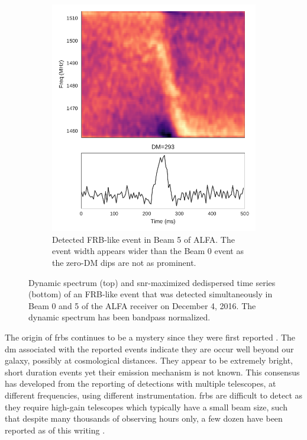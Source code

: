 \documentclass[a4paper,fleqn,usenatbib]{mnras}
\begin{document}
\begin{figure}
\begin{subfigure}[t]{0.45\textwidth}
        \includegraphics[width=1.0\textwidth]{figures/D20161204_buf4_Beam5.pdf}
        \caption{Detected FRB-like event in Beam 5 of ALFA. The event width
        appears wider than the Beam 0 event as the zero-DM dips are not as
        prominent.
        }
        \label{fig:beam5_dynamic_spec}
    \end{subfigure}
    \caption{
    Dynamic spectrum (top) and \gls{snr}-maximized dedispersed time series
    (bottom) of an FRB-like event that was detected simultaneously in Beam 0 and
    5 of the ALFA receiver on December 4, 2016. The dynamic spectrum has been
    bandpass normalized.
    }
    \label{fig:dynamic_spec}
\end{figure}

The origin of \glspl{frb} continues to be a mystery since they were first
reported \citep{2007Sci...318..777L}. The \gls{dm} associated with the reported
events indicate they are occur well beyond our galaxy, possibly at cosmological
distances. They appear to be extremely bright, short duration events yet their
emission mechanism is not known.  This consensus has developed from the
reporting of detections with multiple telescopes, at different frequencies,
using different instrumentation. \glspl{frb} are difficult to detect as they
require high-gain telescopes which typically have a small beam size, such that
despite many thousands of observing hours only, a few dozen have been reported
as of this writing \citep{2016PASA...33...45P}.
\end{document}
